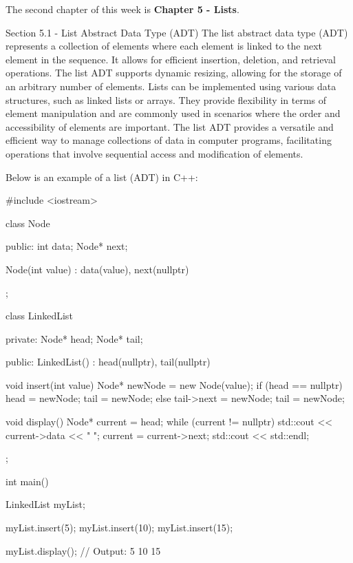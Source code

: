 The second chapter of this week is \textbf{Chapter 5 - Lists}.

\begin{notes}{Section 5.1 - List Abstract Data Type (ADT)}
    The list abstract data type (ADT) represents a collection of elements where each element is linked to the next element in the sequence. It allows for efficient insertion, deletion, and retrieval operations. The list ADT supports dynamic resizing, allowing for the storage of an arbitrary number 
    of elements. Lists can be implemented using various data structures, such as linked lists or arrays. They provide flexibility in terms of element manipulation and are commonly used in scenarios where the order and accessibility of elements are important. The list ADT provides a versatile and efficient 
    way to manage collections of data in computer programs, facilitating operations that involve sequential access and modification of elements.
    
    \begin{highlight}
        Below is an example of a list (ADT) in C++: 
    
    \begin{code}[C++]
    #include <iostream>

    class Node {
    public:
        int data;
        Node* next;

        Node(int value) : data(value), next(nullptr) {}
    };

    class LinkedList {
    private:
        Node* head;
        Node* tail;

    public:
        LinkedList() : head(nullptr), tail(nullptr) {}

        void insert(int value) {
            Node* newNode = new Node(value);
            if (head == nullptr) {
                head = newNode;
                tail = newNode;
            } else {
                tail->next = newNode;
                tail = newNode;
            }
        }

        void display() {
            Node* current = head;
            while (current != nullptr) {
                std::cout << current->data << " ";
                current = current->next;
            }
            std::cout << std::endl;
        }
    };

    int main() {
        LinkedList myList;

        myList.insert(5);
        myList.insert(10);
        myList.insert(15);

        myList.display();  // Output: 5 10 15

}
\end{code}
\end{highlight}
\end{notes}
